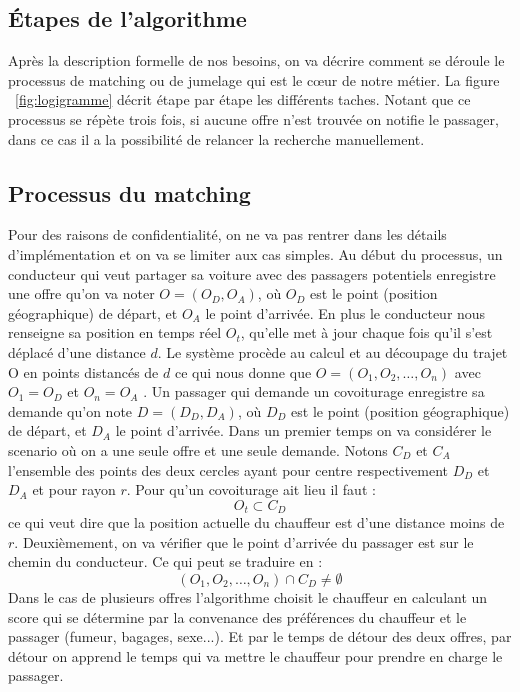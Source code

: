 \subsection{Étapes de l'algorithme} %
Après la description formelle de nos besoins, on va décrire comment se déroule le processus de matching ou de jumelage qui est le cœur de notre métier.\newline
{}\newline
La figure ~\ref{fig:logigramme} décrit étape par étape les différents taches. Notant que ce processus se répète trois fois, si aucune offre n'est trouvée on notifie le passager, dans ce cas il a la possibilité de relancer la recherche manuellement.

\subsection{Processus du matching} %
Pour des raisons de confidentialité, on ne va pas rentrer dans les détails d'implémentation et on va se limiter aux cas simples.\cite{schreieck2016matching}\newline
Au début du processus, un conducteur qui veut partager sa voiture avec des passagers potentiels enregistre 
une offre qu'on va noter $O = (O_D, O_A)$, où $O_D$ est le point (position géographique) de départ, et $O_A$
le point d'arrivée. En plus le conducteur nous renseigne sa position en temps réel $O_t$, qu'elle met à jour chaque fois qu'il s'est déplacé d'une distance $d$. Le système procède au calcul et au découpage du trajet O en points distancés de $d$ ce qui nous donne que $O = (O_{1}, O_{2},\ldots , O_{n})$ avec $O_{1} = O_D$ et $O_{n} = O_A$ .\newline
Un passager qui demande un covoiturage enregistre sa demande qu'on note $D = (D_D, D_A)$, où $D_D$ est le point (position géographique) de départ, et $D_A$ le point d'arrivée.\newline
Dans un premier temps on va considérer le scenario où on a une seule offre et une seule demande. Notons $C_D$ et $C_A$ l'ensemble des points des deux cercles ayant pour centre respectivement $D_D$ et $D_A$ et pour rayon $r$.
Pour qu'un covoiturage ait lieu il faut : 
\begin{equation}
O_t \subset C_D 
\label{eqution1}
\end{equation}
ce qui veut dire que la position actuelle du chauffeur est d'une distance moins de $r$.
Deuxièmement, on va vérifier que le point d'arrivée du passager est sur le chemin du conducteur. Ce qui peut se traduire en :
\begin{equation}
(O_{1}, O_{2},\ldots , O_{n}) \cap C_D \ne \emptyset
\label{eqution2}
\end{equation}
Dans le cas de plusieurs offres l'algorithme choisit le chauffeur en calculant un score qui se détermine par la convenance des préférences du chauffeur et le passager (fumeur, bagages, sexe...). Et par le temps de détour des deux offres, par détour on apprend le temps qui va mettre le chauffeur pour prendre en charge le passager.
